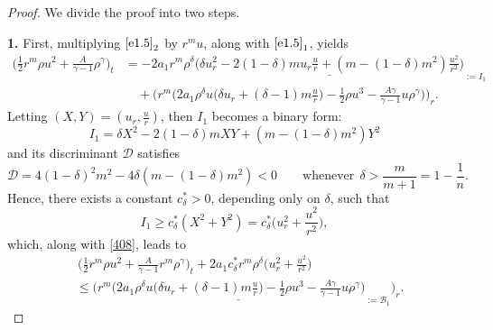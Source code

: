 \documentclass[11pt,reqno]{amsart}
\numberwithin{rk}{section}
\numberwithin{prop}{section}
\numberwithin{mydef}{section}
\numberwithin{lem}{section}
\numberwithin{equation}{section}
\numberwithin{thm}{section}
\begin{document}
\begin{proof}
We divide the proof into two steps.

\smallskip
\textbf{1.} First, multiplying $\eqref{e1.5}_2$ by $r^m u$, along with $\eqref{e1.5}_1$, yields
\begin{equation}\label{408}
\begin{aligned}
\big(\frac{1}{2} r^m\rho u^2+\frac{A}{\gamma-1}\rho^\gamma\big)_t &=-2a_1 r^m\rho^\delta \underline{\Big(\delta u_r^2-2(1-\delta)m u_r\frac{u}{r}+(m-(1-\delta) m^2)\frac{u^2}{r^2}\Big)}_{:=I_1}\\
&\quad+\Big(r^m\big(2a_1 \rho^\delta u \big(\delta u_r+(\delta-1)m\frac{u}{r}\big) -\frac{1}{2}  \rho u^3-\frac{A\gamma}{\gamma-1} u\rho^\gamma\big)\Big)_r.
\end{aligned}
\end{equation}
Letting  $(X,Y)=(u_r,\frac{u}{r})$, then $I_1$ becomes a binary form:
\begin{equation*}
I_1=\delta X^2-2(1-\delta)m XY+(m-(1-\delta)m^2) Y^2    
\end{equation*}
and its discriminant $\mathscr{D}$ satisfies
\begin{equation*} 
\mathscr{D}=4(1-\delta)^2m^2-4\delta(m-(1-\delta)m^2)<0 \qquad \text{whenever} \ \ \delta>\frac{m}{m+1}=1-\frac{1}{n}.    
\end{equation*}
Hence, there exists a constant $c^*_\delta>0$, depending only on $\delta$, such that 
\begin{equation*}
I_1\geq c^*_\delta(X^2+Y^2)=c^*_\delta\big(u_r^2+\frac{u^2}{r^2}\big),
\end{equation*}
which, along with \eqref{408}, leads to
\begin{equation}\label{eap1}
\begin{aligned}
&\,\big( \frac{1}{2} r^m\rho u^2+\frac{A}{\gamma-1}r^m\rho^\gamma\big)_t+2a_1 c^*_\delta r^m\rho^\delta \big(u_r^2+\frac{u^2}{r^2}\big) \\
&\leq\Big(r^m\underline{\big(2a_1 \rho^\delta u \big(\delta u_r+(\delta-1)m\frac{u}{r}\big) -\frac{1}{2}  \rho u^3-\frac{A\gamma}{\gamma-1} u\rho^\gamma\big)}_{:=\mathcal{B}_1}\Big)_r.
\end{aligned}
\end{equation}


\end{proof}
\end{document}
